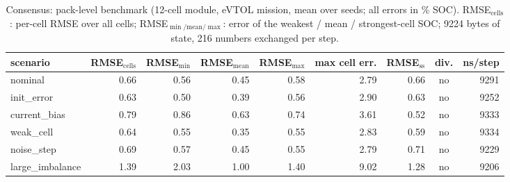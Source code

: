 \begin{table}[H]\centering\footnotesize\setlength{\tabcolsep}{4pt}\caption{Consensus: pack-level benchmark (12-cell module, eVTOL mission, mean over seeds; all errors in \% SOC). RMSE$_\mathrm{cells}$: per-cell RMSE over all cells; RMSE$_{\min/\mathrm{mean}/\max}$: error of the weakest / mean / strongest-cell SOC; 9224 bytes of state, 216 numbers exchanged per step.}\label{tab:pack_Consensus}
\begin{tabular}{lrrrrrrcr}\toprule scenario & RMSE$_\mathrm{cells}$ & RMSE$_{\min}$ & RMSE$_\mathrm{mean}$ & RMSE$_{\max}$ & max cell err. & RMSE$_\mathrm{ss}$ & div. & ns/step \\ \midrule
nominal & 0.66 & 0.56 & 0.45 & 0.58 & 2.79 & 0.66 & no & 9291 \\
init\_error & 0.63 & 0.50 & 0.39 & 0.56 & 2.90 & 0.63 & no & 9252 \\
current\_bias & 0.79 & 0.86 & 0.63 & 0.74 & 3.61 & 0.52 & no & 9333 \\
weak\_cell & 0.64 & 0.55 & 0.35 & 0.55 & 2.83 & 0.59 & no & 9334 \\
noise\_step & 0.69 & 0.57 & 0.45 & 0.55 & 2.79 & 0.71 & no & 9229 \\
large\_imbalance & 1.39 & 2.03 & 1.00 & 1.40 & 9.02 & 1.28 & no & 9206 \\
\bottomrule\end{tabular}\end{table}
